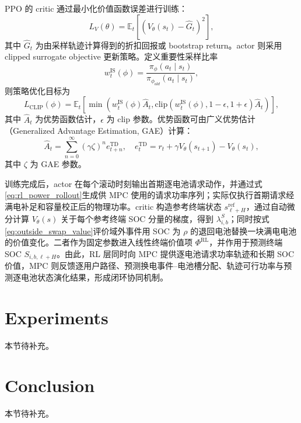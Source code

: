 \documentclass[12pt,a4paper,UTF8]{ctexart}
\begin{document}
PPO 的 critic 通过最小化价值函数误差进行训练：
\begin{equation}
L_V(\theta)=
\mathbb{E}_t\left[
\left(V_{\theta}(s_t)-\hat{G}_t\right)^2
\right],
\label{eq:value_loss}
\end{equation}
其中 $\hat{G}_t$ 为由采样轨迹计算得到的折扣回报或 bootstrap return。actor 则采用 clipped surrogate objective 更新策略。定义重要性采样比率
\begin{equation}
w_t^{\mathrm{IS}}(\phi)=
\frac{\pi_{\phi}(a_t\mid s_t)}{\pi_{\phi_{old}}(a_t\mid s_t)},
\label{eq:ppo_ratio}
\end{equation}
则策略优化目标为
\begin{equation}
L_{\mathrm{CLIP}}(\phi)=
\mathbb{E}_t\left[
\min\left(
w_t^{\mathrm{IS}}(\phi)\hat{A}_t,
\mathrm{clip}(w_t^{\mathrm{IS}}(\phi),1-\epsilon,1+\epsilon)\hat{A}_t
\right)
\right],
\label{eq:ppo_clip}
\end{equation}
其中 $\hat{A}_t$ 为优势函数估计，$\epsilon$ 为 clip 参数。优势函数可由广义优势估计（Generalized Advantage Estimation, GAE）计算：
\begin{equation}
\hat{A}_t=\sum_{n=0}^{\infty}(\gamma\zeta)^n e_{t+n}^{\mathrm{TD}},
\quad
e_t^{\mathrm{TD}}=r_t+\gamma V_{\theta}(s_{t+1})-V_{\theta}(s_t),
\label{eq:gae}
\end{equation}
其中 $\zeta$ 为 GAE 参数。

训练完成后，actor 在每个滚动时刻输出首期逐电池请求动作，并通过式\eqref{eq:rl_power_rollout}生成供 MPC 使用的请求功率序列；实际仅执行首期请求经满电补足和容量校正后的物理功率。critic 构造参考终端状态 $s_{\ell+H}^{\mathrm{ref}}$，通过自动微分计算 $V_{\theta}(s)$ 关于每个参考终端 SOC 分量的梯度，得到 $\lambda^S_{i,b}$；同时按式\eqref{eq:outside_swap_value}评价域外事件用 SOC 为 $\rho$ 的退回电池替换一块满电电池的价值变化。二者作为固定参数进入线性终端价值项 $\Phi^{\mathrm{RL}}$，并作用于预测终端 SOC $S_{i,b,\ell+H}$。由此，RL 层同时向 MPC 提供逐电池请求功率轨迹和长期 SOC 价值，MPC 则反馈逐用户路径、预测换电事件--电池槽分配、轨迹可行功率与预测逐电池状态演化结果，形成闭环协同机制。

\section{Experiments}

本节待补充。

\section{Conclusion}

本节待补充。


\end{document}
